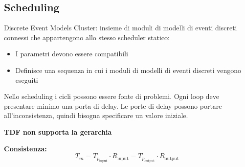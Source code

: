 \documentclass[a4paper]{article}
\begin{document}
		\subsection{Scheduling}
			Discrete Event Models Cluster: insieme di moduli di modelli di eventi discreti connessi che appartengono allo stesso scheduler statico:
			\begin{itemize}
				\item I parametri devono essere compatibili
				\item Definisce una sequenza in cui i moduli di modelli di eventi discreti vengono eseguiti
			\end{itemize}
			
			Nello scheduling i cicli possono essere fonte di problemi. Ogni loop deve presentare minimo una porta di delay. Le porte di delay possono portare all'inconsistenza, quindi bisogna specificare un valore iniziale.
			
			\textbf{TDF non supporta la gerarchia}
			
			\textbf{Consistenza:}
			\[
				T_m = T_{p_{\text{input}}}\cdot R_{\text{input}} = T_{p_{\text{output}}}\cdot R_{\text{output}}
			\]
			
\end{document}
